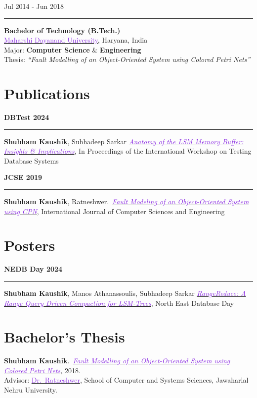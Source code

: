 \documentclass[10pt,a4paper,calibri]{moderncv}
\newcommand{\mediumspace}{\vspace{0.6em}}
\newcommand{\education}[2]{
  \noindent
  \begin{minipage}[c]{0.20\textwidth}
    \hfill
    #1
  \end{minipage}%
  \hspace{0.01\textwidth}
  \begin{minipage}[c]{0.02\textwidth}
    \textcolor{lightgray}{\rule{1pt}{1.6cm}}
  \end{minipage}%
  \begin{minipage}[c]{0.80\textwidth}
    \raggedright{
      #2
    }
  \end{minipage}%
}
\newcommand{\publications}[2]{
  \noindent
  \begin{minipage}[c]{0.15\textwidth}
    \centering
    \textbf{#1}
  \end{minipage}%
  \hspace{0.01\textwidth}
  \begin{minipage}[c]{0.02\textwidth}
    \textcolor{lightgray}{\rule{1pt}{0.75cm}}
  \end{minipage}%
  \begin{minipage}[c]{0.80\textwidth}
    \raggedright{
      #2
    }
  \end{minipage}%
}
\begin{document}
\education{Jul 2014 \-- Jun 2018}
{
	\textbf{Bachelor of Technology (B.Tech.)}\\
	\href{https://mdu.ac.in/}{\textcolor{blueviolet}{Maharshi Dayanand University}}, Haryana, India\\
	Major: \textbf{Computer Science} \& \textbf{Engineering}\\
	Thesis: \textit{“Fault Modelling of an Object-Oriented System using Colored Petri Nets”}\\
}


\section{Publications}
\publications{DBTest 2024}{\textbf{Shubham Kaushik}, Subhadeep Sarkar \href{https://doi.org/10.1145/3662165.3662766}{\textit{\textcolor{blueviolet}{Anatomy
				of the LSM Memory Buffer: Insights \& Implications}}}, In Proceedings of the International Workshop on Testing Database Systems}

\mediumspace

\publications{JCSE 2019}{\textbf{Shubham Kaushik}, Ratneshwer.\ \href{https://doi.org/10.26438/ijcse/v7i5.18281845}{\textit{\textcolor{blueviolet}{Fault
				Modeling of an Object-Oriented System using CPN}}}, International Journal of Computer Sciences and Engineering}

\mediumspace

\section{Posters}
\publications{NEDB Day 2024}{\textbf{Shubham Kaushik}, Manos Athanassoulis, Subhadeep Sarkar \href{https://bu-disc.github.io/nedbday/2024/download/posters/RangeReduce_A_Range_Query_Driven_Compaction_for_LSM-Trees.pdf}{\textit{\textcolor{blueviolet}{RangeReduce: A Range Query Driven Compaction for LSM-Trees}}}, North East Database Day}


\section{Bachelor's Thesis}
\textbf{Shubham Kaushik}.\ \href{https://doi.org/10.26438/ijcse/v7i5.18281845}
{\textit{\textcolor{blueviolet}{Fault Modelling of an Object-Oriented System using Colored Petri Nets},}} 2018.\\
Advisor:
\href{https://www.jnu.ac.in/content/ratnesh}{\textcolor{blueviolet}{Dr.\
		Ratneshwer}}, School of Computer and Systems Sciences, Jawaharlal Nehru
University.
\end{document}
